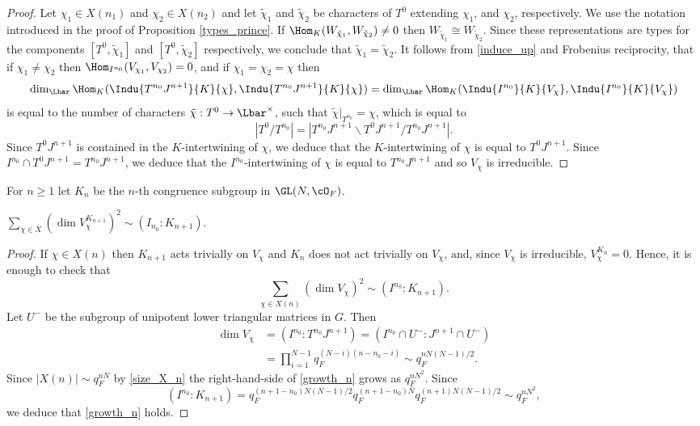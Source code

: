 \begin{proof} Let $\chi_1\in X(n_1)$ and $\chi_2\in X(n_2)$ and let $\tilde{\chi}_1$ and $\tilde{\chi}_2$ be characters of $T^0$ extending $\chi_1$, and $\chi_2$, respectively.
We use the notation introduced in the proof of Proposition \ref{types_prince}. If $\Hom_K(W_{\tilde{\chi}_1}, W_{\tilde{\chi}_2})\neq 0$ then $W_{\tilde{\chi}_1}\cong W_{\tilde{\chi}_2}$.
Since these representations are types for the components $[T^0, \tilde{\chi}_1]$ and
$[T^0, \tilde{\chi}_2]$ respectively, we conclude that $\tilde{\chi}_1=\tilde{\chi}_2$. It follows from
\eqref{induce_up} and Frobenius reciprocity, that if $\chi_1\neq \chi_2$ then $\Hom_{I^{n_0}}(V_{\chi_1}, V_{\chi_2})=0$, and if $\chi_1=\chi_2=\chi$ then
\[
\dim_{\Lbar}\Hom_K( \Indu{T^{n_0}J^{n+1}}{K}{\chi}, \Indu{T^{n_0}J^{n+1}}{K}{\chi})= \dim_{\Lbar} \Hom_K( \Indu{I^{n_0}}{K}{V_\chi}, \Indu{I^{n_0}}{K}{V_\chi})
\]
is equal to the number of characters $\tilde{\chi}: T^0\to \Lbar^{\times}$, such that $\tilde{\chi}|_{T^{n_0}}= \chi$, which is equal to
\[
| T^0/ T^{n_0}|=|T^{n_0} J^{n+1}\backslash T^{0} J^{n+1} / T^{n_0} J^{n+1}|.
\]
Since $T^0 J^{n+1}$ is contained in the $K$-intertwining of $\chi$, we deduce that the $K$\nobreakdash-inter\-twining of $\chi$ is equal to $T^0 J^{n+1}$. Since $I^{n_0} \cap T^0 J^{n+1}= T^{n_0} J^{n+1}$,
we deduce that the $I^{n_0}$-intertwining of $\chi$ is equal to $T^{n_0} J^{n+1}$ and so $V_{\chi}$ is irreducible.
\end{proof}

For $n\ge 1$ let $K_n$ be the $n$-th congruence subgroup in $\GL(N, \cO_F)$.
\begin{lem}\label{asymptotic_prince}
$\sum_{\chi\in X} (\dim V_{\chi}^{K_{n+1}})^2 \sim (I_{n_0}: K_{n+1})$.
\end{lem}

\begin{proof}
If $\chi\in X(n)$ then $K_{n+1}$ acts trivially on $V_{\chi}$ and $K_n$ does not act trivially on $V_{\chi}$, and, since $V_{\chi}$ is irreducible, $V_{\chi}^{K_n}=0$. Hence, it is enough to check that
\begin{equation}\label{growth_n}
\sum_{\chi\in X(n)} (\dim V_{\chi})^2 \sim (I^{n_0}: K_{n+1}).
\end{equation}
Let $U^-$ be the subgroup of unipotent lower triangular matrices in $G$. Then
\begin{equation} \label{dim_V_chi}
\begin{split}
\dim V_{\chi}&= ( I^{n_0}: T^{n_0} J^{n+1})= (I^{n_0}\cap U^-: J^{n+1} \cap U^-)\\
& = \prod_{i=1}^{N-1} q_F^{(N-i)(n-n_0-i)}\sim q_F^{n N(N-1)/2}.
\end{split}
\end{equation}
Since $|X(n)|\sim q_F^{nN}$ by \eqref{size_X_n} the right-hand-side of \eqref{growth_n} grows as $q_F^{n N^2}$. Since
\begin{equation} \label{index}
(I^{n_0}: K_{n+1})= q_F^{(n+1 -n_0) N(N-1)/2} q_F^{(n+1-n_0) N} q_F^{(n+1)N(N-1)/2}\sim q_F^{n N^2},
\end{equation}
we deduce that \eqref{growth_n} holds.
\end{proof}

